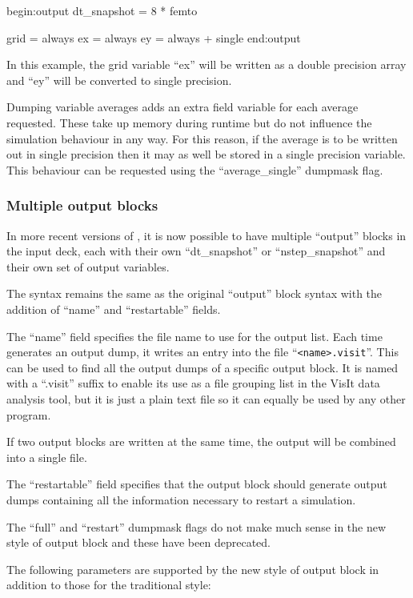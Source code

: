 \begin{boxverbatim}
begin:output
   dt_snapshot = 8 * femto

   grid = always
   ex = always
   ey = always + single
end:output
\end{boxverbatim}

In this example, the grid variable ``ex'' will be written as a
double precision array and ``ey'' will be converted to single
precision.

Dumping variable averages adds an extra field variable for each average
requested. These take up memory during runtime but do not influence the
simulation behaviour in any way. For this reason, if the average is to be
written out in single precision then it may as well be stored in a single
precision variable. This behaviour can be requested using the
``average\_single'' dumpmask flag.


\subsubsection{Multiple output blocks}
\label{sec:multiple_output}

In more recent versions of {\EPOCH}, it is now possible to have multiple
``output'' blocks in the input deck,
each with their own ``dt\_snapshot'' or ``nstep\_snapshot'' and their
own set of output variables.

The syntax remains the same as the original ``output'' block syntax with the
addition of ``name'' and ``restartable'' fields.

The ``name'' field specifies the file name to use for the output list. Each
time {\EPOCH} generates an output dump, it writes an entry into the file
``\verb|<name>.visit|''. This can be used to find all the output dumps of a
specific output block. It is named with a ``.visit'' suffix to enable its use as
a file grouping list in the VisIt data analysis tool, but it is just a plain
text file so it can equally be used by any other program.

If two output blocks are written at the same time, the output will be combined
into a single file.

The ``restartable'' field specifies that the output block should
generate output dumps containing all the information necessary
to restart a simulation.

The ``full'' and ``restart'' dumpmask flags do not make much sense in the new
style of output block and these have been deprecated.

The following parameters are supported by the new style of output block in
addition to those for the traditional style:

